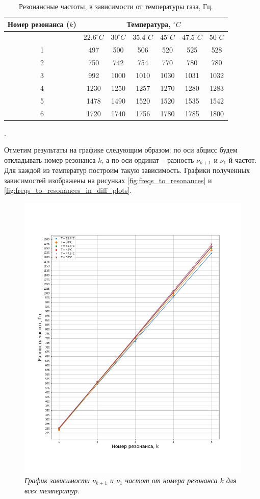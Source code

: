 \documentclass[a4paper, 12pt]{article}
\newcounter{Points}
\newcommand{\point}{\arabic{Points}. \addtocounter{Points}{1}}
\begin{document}
\begin{table}[h]
    \centering
    \begin{tabular}{|c|c|c|c|c|c|c|}
    \hline 
    Номер резонанса ($k$)   & \multicolumn{6}{|c|}{Температура, $^\circ C$} \\ \hline
                            & $22.6^{\circ} C$ & $30^{\circ} C$ & $35.4^{\circ} C$ & $45^{\circ} C$ & $47.5^{\circ} C$ & $50^{\circ} C$  \\ \hline

    1	&	 497	&	 500	&	 506	&	 520	&	 525	&	 528	\\ \hline
    2	&	 750	&	 742	&	 754	&	 770	&	 780	&	 780	\\ \hline
    3	&	 992	&	1000	&	1010	&	1030	&	1031	&	1032	\\ \hline
    4	&	1230	&	1250	&	1257	&	1270	&	1280	&	1283	\\ \hline
    5	&	1478	&	1490	&	1520	&	1520	&	1535	&	1542	\\ \hline
    6	&	1720	&	1740	&	1756	&	1780	&	1785	&	1800	\\ \hline
                            
    \end{tabular}
	\caption{Резонансные частоты, в зависимости от температуры газа, Гц.}
    \label{tabl:data}
\end{table}

\point Отметим результаты на графике следующим образом: по оси абцисс будем откладывать номер резонанса $k$, а по оси ординат -- разность $\nu_{k + 1}$ и $\nu_1$-й частот. Для каждой из температур построим такую зависимость. Графики полученных зависимостей изображены на рисунках \ref{fig:freqs_to_resonances} и \ref{fig:freqs_to_resonances_in_diff_plots}.

\begin{figure}[hb]
    \centering
    \includegraphics[width=0.7\linewidth]{freqs_to_resonances.png}
    \caption{\textit{График зависимости $\nu_{k + 1}$ и $\nu_1$ частот от номера резонанса $k$ для всех температур.}}
    \label{freqs_to_resonances}
\end{figure}
\end{document}
